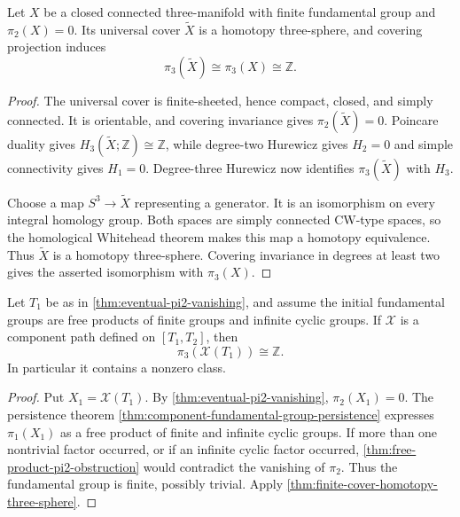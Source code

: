 \begin{theorem}
\label{thm:finite-cover-homotopy-three-sphere}
\notready
Let $X$ be a closed connected three-manifold with finite fundamental group
and $\pi_2(X)=0$.  Its universal cover $\widetilde X$ is a homotopy
three-sphere, and covering projection induces
\[
 \pi_3(\widetilde X)\cong\pi_3(X)\cong\mathbb Z.
\]
\end{theorem}

\begin{proof}
The universal cover is finite-sheeted, hence compact, closed, and simply
connected.  It is orientable, and covering invariance gives
$\pi_2(\widetilde X)=0$.  Poincare duality gives
$H_3(\widetilde X;\mathbb Z)\cong\mathbb Z$, while degree-two Hurewicz gives
$H_2=0$ and simple connectivity gives $H_1=0$.  Degree-three Hurewicz now
identifies $\pi_3(\widetilde X)$ with $H_3$.

Choose a map $S^3\to\widetilde X$ representing a generator.  It is an
isomorphism on every integral homology group.  Both spaces are simply
connected CW-type spaces, so the homological Whitehead theorem makes this map
a homotopy equivalence.  Thus $\widetilde X$ is a homotopy three-sphere.
Covering invariance in degrees at least two gives the asserted isomorphism
with $\pi_3(X)$.
\end{proof}

\begin{theorem}
\label{thm:late-component-nontrivial-pi3}
\notready
Let $T_1$ be as in \ref{thm:eventual-pi2-vanishing}, and assume the initial
fundamental groups are free products of finite groups and infinite cyclic
groups.  If $\mathcal X$ is a component path defined on $[T_1,T_2]$, then
\[
 \pi_3(\mathcal X(T_1))\cong\mathbb Z.
\]
In particular it contains a nonzero class.
\end{theorem}

\begin{proof}
Put $X_1=\mathcal X(T_1)$.  By \ref{thm:eventual-pi2-vanishing},
$\pi_2(X_1)=0$.  The persistence theorem
\ref{thm:component-fundamental-group-persistence} expresses $\pi_1(X_1)$
as a free product of finite and infinite cyclic
groups.  If more than one nontrivial factor occurred, or if an infinite
cyclic factor occurred, \ref{thm:free-product-pi2-obstruction} would
contradict the vanishing of $\pi_2$.  Thus the fundamental group is finite,
possibly trivial.  Apply \ref{thm:finite-cover-homotopy-three-sphere}.
\end{proof}

